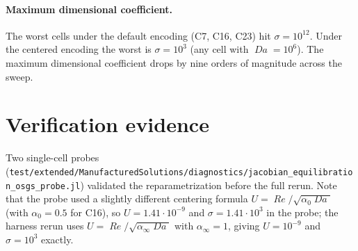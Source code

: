 \documentclass[11pt]{article}
\newcommand{\Reyn}{\operatorname{\mathit{Re}}}
\newcommand{\Damk}{\operatorname{\mathit{Da}}}
\begin{document}
\paragraph{Maximum dimensional coefficient.}
The worst cells under the default encoding (C7, C16, C23) hit
$\sigma = 10^{12}$. Under the centered encoding the worst is
$\sigma = 10^{3}$ (any cell with $\Damk = 10^{6}$). The maximum dimensional
coefficient drops by nine orders of magnitude across the sweep.

\section{Verification evidence}

Two single-cell probes
(\texttt{test/extended/ManufacturedSolutions/diagnostics/jacobian\_equilibration\_osgs\_probe.jl})
validated the reparametrization before the full rerun. Note that the
probe used a slightly different centering formula
$U = \Reyn/\sqrt{\alpha_0 \Damk}$ (with $\alpha_0 = 0.5$ for C16), so
$U = 1.41\cdot10^{-9}$ and $\sigma = 1.41\cdot10^{3}$ in the probe;
the harness rerun uses $U = \Reyn/\sqrt{\alpha_\infty \Damk}$ with
$\alpha_\infty = 1$, giving $U = 10^{-9}$ and $\sigma = 10^{3}$ exactly.
\end{document}
